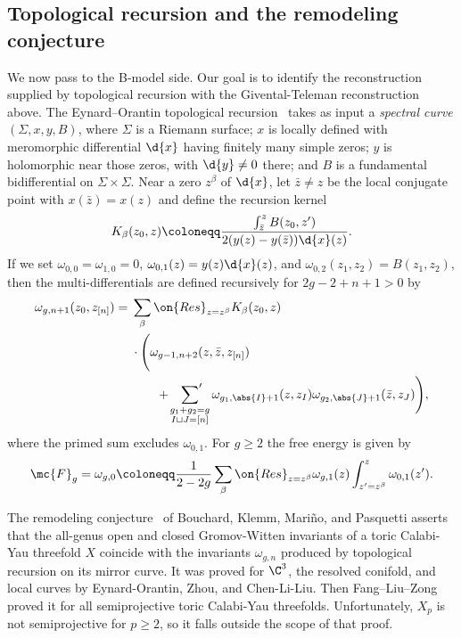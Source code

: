\subsection{Topological recursion and the remodeling conjecture}%
\label{sub:Topological recursion and the remodeling conjecture}

We now pass to the B-model side. Our goal is to identify the reconstruction supplied by topological recursion with the Givental-Teleman reconstruction above. The Eynard--Orantin topological recursion~\cite{EO2007} takes as input a \textit{spectral curve} \((\Sigma,x,y,B)\), where \(\Sigma\) is a Riemann surface; \(x\) is locally defined with meromorphic differential \(\d{x}\) having finitely many simple zeros; \(y\) is holomorphic near those zeros, with \(\d{y} \neq 0\) there; and \(B\) is a fundamental bidifferential on \(\Sigma \times \Sigma\). Near a zero \(z^{\beta}\) of \(\d{x}\), let \(\bar{z} \neq z\) be the local conjugate point with \(x(\bar{z}) = x(z)\) and define the recursion kernel
\[ K_{\beta}(z_0,z) \coloneqq \frac{\int_{\bar{z}}^z B(z_0,z')}{2(y(z)-y(\bar{z}))\d{x}(z)}. \]
If we set \(\omega_{0,0} = \omega_{1,0} = 0\), \(\omega_{0,1}(z) = y(z)\d{x}(z)\), and \(\omega_{0,2}(z_1,z_2) = B(z_1,z_2)\), then the multi-differentials are defined recursively for \(2g-2+n+1 > 0\) by
\begin{align*}
    \omega_{g,n+1}(z_0,z_{[n]}) ={}& \sum_{\beta}\on{Res}_{z = z^{\beta}} K_{\beta}(z_0,z) \\
    &\cdot \Bigg( \omega_{g-1,n+2}(z,\bar{z},z_{[n]}) \\
    &\qquad + \sideset{}{'}\sum_{\substack{g_1+g_2 = g \\ I \sqcup J = [n]}}\omega_{g_1,\abs{I}+1}(z,z_I)\omega_{g_2,\abs{J}+1}(\bar{z},z_J)\Bigg),
\end{align*}
where the primed sum excludes \(\omega_{0,1}\). For \(g \geq 2\) the free energy is given by
\[ \mc{F}_g = \omega_{g,0} \coloneqq \frac{1}{2-2g}\sum_{\beta}\on{Res}_{z=z^{\beta}}\omega_{g,1}(z)\int_{z'=z^{\beta}}^z \omega_{0,1}(z'). \]

The remodeling conjecture~\cite{BKMP2009} of Bouchard, Klemm, Mari\~{n}o, and Pasquetti asserts that the all-genus open and closed Gromov-Witten invariants of a toric Calabi-Yau threefold \(X\) coincide with the invariants \(\omega_{g,n}\) produced by topological recursion on its mirror curve. It was proved for \(\C^3\), the resolved conifold, and local curves by Eynard-Orantin, Zhou, and Chen-Li-Liu. Then Fang--Liu--Zong~\cite{FLZ2020} proved it for all semiprojective toric Calabi-Yau threefolds. Unfortunately, \(X_p\) is not semiprojective for \(p \geq 2\), so it falls outside the scope of that proof.


